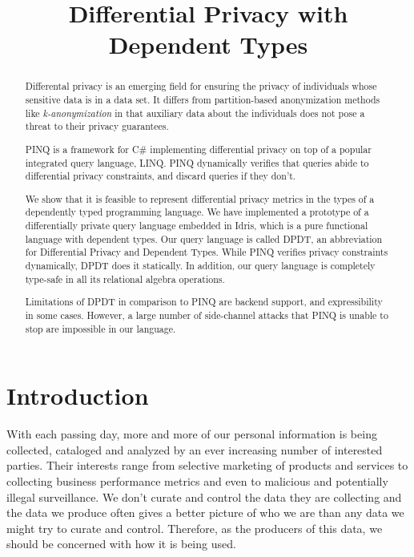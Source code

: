 \documentclass[12pt]{article}
\title{Differential Privacy with Dependent Types}
\begin{document}
\maketitle


\graphicspath{{assets/}}
\begin{abstract}
Differental privacy is an emerging field for ensuring the privacy of individuals whose sensitive data is in a data set.
It differs from partition-based anonymization methods like \textit{k-anonymization} in that auxiliary data about the individuals does not pose a threat to their privacy guarantees\cite{ganta2008composition}.

PINQ is a framework for C\# implementing differential privacy on top of a popular integrated query language, LINQ\cite{conf/sigmod/McSherry09}.
PINQ dynamically verifies that queries abide to differential privacy constraints, and discard queries if they don't.

We show that it is feasible to represent differential privacy metrics in the types of a dependently typed programming language.
We have implemented a prototype of a differentially private query language embedded in Idris, which is a pure functional language with dependent types.
Our query language is called DPDT, an abbreviation for Differential Privacy and Dependent Types.
While PINQ verifies privacy constraints dynamically, DPDT does it statically.
In addition, our query language is completely type-safe in all its relational algebra operations.

Limitations of DPDT in comparison to PINQ are backend support, and expressibility in some cases.
However, a large number of side-channel attacks that PINQ is unable to stop are impossible in our language.

\end{abstract}

\section{Introduction}\label{sec:introduction}


With each passing day, more and more of our personal information is being collected, cataloged and analyzed by an ever increasing number of interested parties.
Their interests range from selective marketing of products and services to collecting business performance metrics and even to malicious and potentially illegal surveillance.
We don't curate and control the data they are collecting and the data we produce often gives a better picture of who we are than any data we might try to curate and control.
Therefore, as the producers of this data, we should be concerned with how it is being used.
\end{document}
